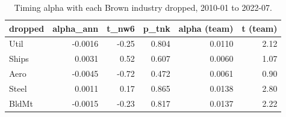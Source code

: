 \begin{table}[htbp]\centering\small
\caption{Timing alpha with each Brown industry dropped, 2010-01 to 2022-07.}
\label{tab:m8_drop_one}
\begin{tabular}{lrrrrr}
\toprule
dropped & alpha\_ann & t\_nw6 & p\_tnk & alpha (team) & t (team) \\
\midrule
Util & -0.0016 & -0.25 & 0.804 & 0.0110 & 2.12 \\
Ships & 0.0031 & 0.52 & 0.607 & 0.0060 & 1.07 \\
Aero & -0.0045 & -0.72 & 0.472 & 0.0061 & 0.90 \\
Steel & 0.0011 & 0.17 & 0.865 & 0.0138 & 2.80 \\
BldMt & -0.0015 & -0.23 & 0.817 & 0.0137 & 2.22 \\
\bottomrule
\end{tabular}
\end{table}
